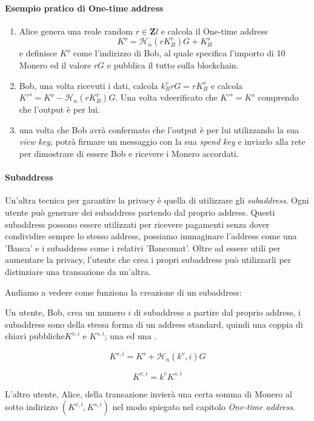 \documentclass[12pt,a4paper]{article}
\begin{document}
\paragraph{Esempio pratico di One-time address}

\begin{enumerate}
    \item Alice genera una reale random $r \in \mathbf{Z}l $ e calcola il
    One-time address $$ K^{o} = \mathcal{H}_n(rK^v_B)G+K^s_B $$ e definisce
    $K^{o}$ come l'indirizzo di Bob, al quale specifica l'importo di 10 Monero
    ed il valore $rG$ e pubblica il tutto sulla blockchain.
    \item Bob, una volta ricevuti i dati, calcola $k^v_BrG = rK^v_B$ e calcola
    ${K'}^s = K^o - \mathcal{H}_n(rK^v_B)G$. Una volta vdeerificato che
    $K'^s = K^s$ comprendo che l'output è per lui.
    \item una volta che Bob avrà confermato che l'output è per lui utilizzando
    la sua \textit{view key}, potrà firmare un messaggio con la sua
    \textit{spend key} e inviarlo alla rete per dimostrare di essere Bob e
    ricevere i Monero accordati.
\end{enumerate}

\paragraph{Subaddress}
Un'altra tecnica per garantire la privacy è quella di utilizzare gli
\textit{subaddress}. Ogni utente può generare dei subaddress partendo dal
proprio address. Questi subaddress possono essere utilizzati per ricevere
pagamenti senza dover condividire sempre lo stesso address, possiamo immaginare
l'address come una 'Banca' e i subaddress come i relativi 'Bancomat'. Oltre ad
essere utili per aumentare la privacy, l'utente che crea i propri subaddress può
utilizzarli per distinziare una transazione da un'altra.

Andiamo a vedere come funziona la creazione di un subaddress:

Un utente, Bob, crea un numero $ i $ di subaddress a partire dal proprio
address, i subaddress sono della stessa forma di un address standard, quindi una
coppia di chiavi pubbliche$ K^{v,i} $ e $ K^{s,i} $; una  ed una
.

$$ K^{s,i} = K^s + \mathcal{H}_n(k^v, i)G $$ 

$$ K^{v,i} = k^vK^{s,i} $$

L'altro utente, Alice, della transazione invierà una certa somma di Monero al
sotto indirizzo $ (K^{v,i}, K^{s,i}) $ nel modo spiegato nel capitolo
\textit{One-time address}.
\end{document}

